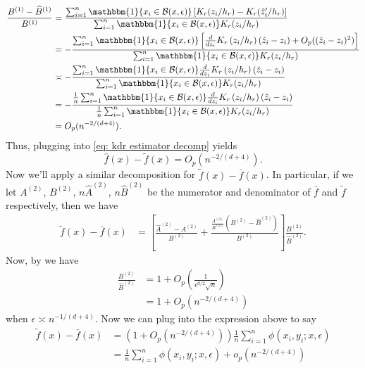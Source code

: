 \documentclass[11pt]{article}
\begin{document}
\begin{align}
    \frac{B^{(1)} - \widehat{B}^{(1)}}{B^{(1)}} &= \frac{\sum_{i = 1}^n\mathbbm{1}\{x_i \in \mathcal{B}(x, \epsilon)\}\left[K_r(z_i/h_r) - K_r(\hat{z}_i'/h_r)\right]
    }{\sum_{i = 1}^n\mathbbm{1}\{x_i \in \mathcal{B}(x, \epsilon)\}K_r(z_i/h_r)} \\
    &= -\frac{\sum_{i = 1}^n\mathbbm{1}\{x_i \in \mathcal{B}(x, \epsilon)\}\left[\frac{d}{dz_i}K_r\left(z_i/h_r\right)(\hat{z}_i - z_i) + O_p((\hat{z}_i - z_i)^2)\right]
    }{\sum_{i = 1}^n\mathbbm{1}\{x_i \in \mathcal{B}(x, \epsilon)\}K_r(z_i/h_r)} \\
    &\asymp -\frac{\sum_{i = 1}^n\mathbbm{1}\{x_i \in \mathcal{B}(x, \epsilon)\}\frac{d}{dz_i}K_r\left(z_i/h_r\right)(\hat{z}_i - z_i)
    }{\sum_{i = 1}^n\mathbbm{1}\{x_i \in \mathcal{B}(x, \epsilon)\}K_r(z_i/h_r)} \\
    &= -\frac{\frac{1}{n}\sum_{i = 1}^n\mathbbm{1}\{x_i \in \mathcal{B}(x, \epsilon)\}\frac{d}{dz_i}K_r\left(z_i/h_r\right)(\hat{z}_i - z_i)
    }{\frac{1}{n}\sum_{i = 1}^n\mathbbm{1}\{x_i \in \mathcal{B}(x, \epsilon)\}K_r(z_i/h_r)} \\
    &= O_p(n^{-2/(d+4)}).
\end{align}
Thus, plugging into \cref{eq: kdr estimator decomp} yields
\begin{equation}
    \hat{f}(x) - \tilde{f}(x) = O_p(n^{-2/(d+4)}).
\end{equation}
Now we'll apply a similar decomposition for $\tilde{f}(x) - \bar{f}(x)$. In particular, if we let $A^{(2)}$, $B^{(2)}$, $n\widehat{A}^{(2)}$, $n\widehat{B}^{(2)}$ be the numerator and denominator of $\bar{f}$ and $\tilde{f}$ respectively, then we have
\begin{align}
    \tilde{f}(x) - \bar{f}(x) &=  \left[\frac{\widehat{A}^{(2)}-A^{(2)}}{B^{(2)}} + \frac{\frac{A^{(2)}}{B^{(2)}}\left(B^{(2)} - \widehat{B}^{(2)}\right)}{B^{(2)}}\right]\frac{B^{(2)}}{\widehat{B}^{(2)}}. 
\end{align}
Now, by  we have
\begin{align}
    \frac{B^{(2)}}{\widehat{B}^{(2)}} &= 1 + O_p\left(\frac{1}{\epsilon^{d/2}\sqrt{n}}\right) \\
    &= 1+ O_p\left(n^{-2/(d+4)}\right)
\end{align}
when $\epsilon \asymp n^{-1/(d+4)}.$ Now we can plug into the expression above to say
\begin{align}
    \tilde{f}(x) - \bar{f}(x) &= \left(1 + O_p(n^{-2/(d+4)})\right)\frac{1}{n}\sum_{i = 1}^n\phi(x_i, y_i; x, \epsilon) \\
    &= \frac{1}{n}\sum_{i = 1}^n\phi(x_i, y_i; x, \epsilon) + o_p(n^{-2/(d+4)})
\end{align}
\end{document}
